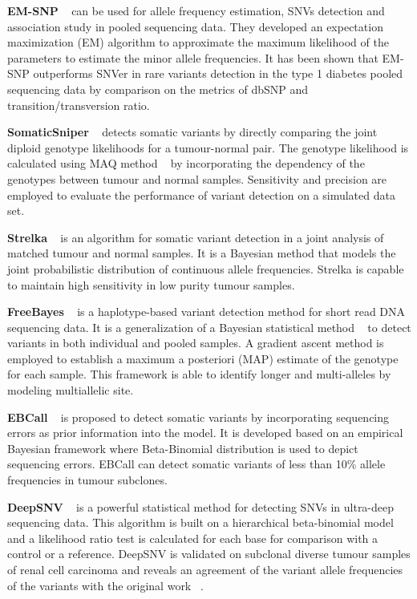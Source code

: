 \documentclass[11pt,reqno]{amsart}
\begin{document}
\textbf{EM-SNP} ~\citep{Chen2013} can be used for allele frequency estimation, SNVs detection and association study in pooled sequencing data.
They developed an expectation maximization (EM) algorithm to approximate the maximum likelihood of the parameters to estimate the minor allele frequencies.
It has been shown that EM-SNP outperforms SNVer in rare variants detection in the type 1 diabetes pooled sequencing data by comparison on the metrics of dbSNP and transition/transversion ratio.

\textbf{SomaticSniper} ~\citep{Larson2012} detects somatic variants by directly comparing the joint diploid genotype likelihoods for a tumour-normal pair.
The genotype likelihood is calculated using MAQ method ~\citep{Li2008} by incorporating the dependency of the genotypes between tumour and normal samples.
Sensitivity and precision are employed to evaluate the performance of variant detection on a simulated data set.

\textbf{Strelka} ~\citep{Saunders2012} is an algorithm for somatic variant detection in a joint analysis of matched tumour and normal samples.
It is a Bayesian method that models the joint probabilistic distribution of continuous allele frequencies.
Strelka is capable to maintain high sensitivity in low purity tumour samples.

\textbf{FreeBayes} ~\citep{Garrison2012} is a haplotype-based variant detection method for short read DNA sequencing data.
It is a generalization of a Bayesian statistical method ~\citep{marth1999general} to detect variants in both individual and pooled samples.
A gradient ascent method is employed to establish a maximum a posteriori (MAP) estimate of the genotype for each sample.
This framework is able to identify longer and multi-alleles by modeling multiallelic site.

\textbf{EBCall} ~\citep{Shiraishi2013} is proposed to detect somatic variants by incorporating sequencing errors as prior information into the model.
It is developed based on an empirical Bayesian framework where Beta-Binomial distribution is used to depict sequencing errors.
EBCall can detect somatic variants of less than 10\% allele frequencies in tumour subclones.

\textbf{DeepSNV} ~\citep{gerstung2012reliable} is a powerful statistical method for detecting SNVs in ultra-deep sequencing data.
This algorithm is built on a hierarchical beta-binomial model and a likelihood ratio test is calculated for each base for comparison with a control or a reference.
DeepSNV is validated on subclonal diverse tumour samples of renal cell carcinoma and reveals an agreement of the variant allele frequencies of the variants with the original work ~\citep{gerstung2012reliable}.
\end{document}
